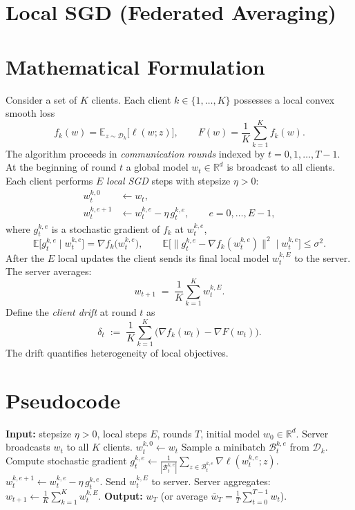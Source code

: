 \documentclass[11pt]{article}
\newcommand{\E}{\mathbb{E}}
\newcommand{\R}{\mathbb{R}}
\newcommand{\grad}{\nabla}
\newcommand{\del}{\delta}
\begin{document}
\section*{Local SGD (Federated Averaging)}

\section*{Mathematical Formulation}
Consider a set of $K$ clients.  Each client $k\in\{1,\dots,K\}$ possesses a local convex smooth loss
\[
f_k(w)=\E_{z\sim\mathcal{D}_k}\!\big[\ell(w;z)\big],\qquad 
F(w)=\frac1K\sum_{k=1}^{K} f_k(w) .
\]
The algorithm proceeds in \emph{communication rounds} indexed by $t=0,1,\dots,T-1$.
At the beginning of round $t$ a global model $w_t\in\R^d$ is broadcast to all clients.
Each client performs $E$ \emph{local SGD} steps with stepsize $\eta>0$:
\[
\begin{aligned}
w_{t}^{k,0} &\gets w_t,\\
w_{t}^{k,e+1} &\gets w_{t}^{k,e} - \eta \, g_{t}^{k,e},
\qquad e=0,\dots,E-1,
\end{aligned}
\]
where $g_{t}^{k,e}$ is a stochastic gradient of $f_k$ at $w_{t}^{k,e}$,
\[
\E\!\big[g_{t}^{k,e}\mid w_{t}^{k,e}\big]=\grad f_k\!\big(w_{t}^{k,e}\big),\qquad 
\E\!\big[\|g_{t}^{k,e}-\grad f_k(w_{t}^{k,e})\|^2\mid w_{t}^{k,e}\big]\le\sigma^2 .
\]
After the $E$ local updates the client sends its final local model $w_{t}^{k,E}$ to the server.
The server averages:
\[
w_{t+1}\;=\;\frac1K\sum_{k=1}^{K} w_{t}^{k,E}.
\]
Define the \emph{client drift} at round $t$ as
\[
\del_t\;:=\;\frac1K\sum_{k=1}^{K}\big(\grad f_k(w_t)-\grad F(w_t)\big).
\]
The drift quantifies heterogeneity of local objectives.

\section*{Pseudocode}
\begin{algorithm}[H]
\caption{Federated Averaging (Local SGD)}\label{alg:fedavg}
\begin{algorithmic}[1]
\State \textbf{Input:} stepsize $\eta>0$, local steps $E$, rounds $T$, initial model $w_0\in\R^d$.
    \State Server broadcasts $w_t$ to all $K$ clients.
        \State $w_{t}^{k,0}\gets w_t$
            \State Sample a minibatch $\mathcal{B}_{t}^{k,e}$ from $\mathcal{D}_k$.
            \State Compute stochastic gradient 
            $g_{t}^{k,e}\gets \frac1{|\mathcal{B}_{t}^{k,e}|}\sum_{z\in\mathcal{B}_{t}^{k,e}}\grad\ell(w_{t}^{k,e};z)$.
            \State $w_{t}^{k,e+1}\gets w_{t}^{k,e}-\eta\, g_{t}^{k,e}$.
        \EndFor
        \State Send $w_{t}^{k,E}$ to server.
    \EndFor
    \State Server aggregates: $w_{t+1}\gets \frac1K\sum_{k=1}^{K} w_{t}^{k,E}$.
\EndFor
\State \textbf{Output:} $w_T$ (or average $\bar w_T=\frac1T\sum_{t=0}^{T-1}w_t$).
\end{algorithmic}
\end{algorithm}
\end{document}
